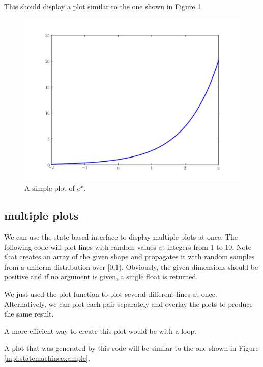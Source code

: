 This should display a plot similar to the one shown in Figure
\ref{mpl:explot}.

\begin{figure}
\includegraphics[width=\textwidth]{explot.pdf}
\caption{A simple plot of $e^x$.} 
\label{mpl:explot} 
\end{figure}

\subsection*{multiple plots}
We can use the state based interface to display multiple plots at once. 
The following code will plot lines with random values at integers from 1 to 10. 
Note that  creates an array of the given shape and propagates it with random samples from a uniform distribution over [0,1). Obviously, the given dimensions should be positive and if no argument is given, a single float is returned. 



We just used the plot function to plot several different lines at once. Alternatively, we can plot each  pair separately and overlay the plots to produce the same result. 



A more efficient way to create this plot would be with a loop.



A plot that was generated by this code will be similar to the one shown
in Figure \ref{mpl:statemachineexample}.

